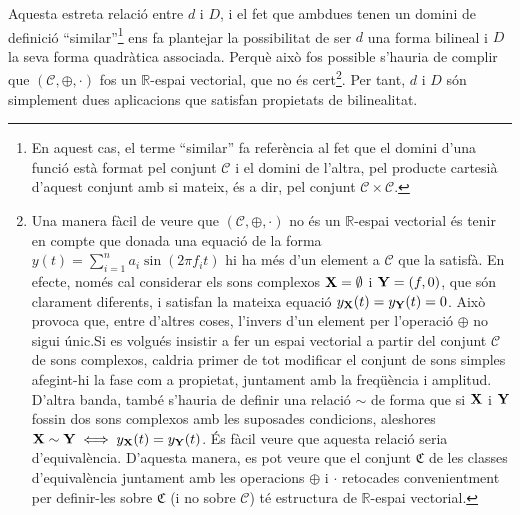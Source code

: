 \documentclass{article}
\theoremstyle{math}
\theoremstyle{TheoremNum}
\newcommand{\0}{\ensuremath{\vb{0}}}
\newcommand{\X}{\ensuremath{\vb{X}}}
\newcommand{\Y}{\ensuremath{\vb{Y}}}
\newcommand{\RR}{\ensuremath{\mathbb{R}}} %
\begin{document}
Aquesta estreta relació entre $d$ i $D$, i el fet que ambdues tenen un domini de definició ``similar''\footnote{En aquest cas, el terme ``similar'' fa referència al fet que el domini d'una funció està format pel conjunt $\mathcal{C}$ i el domini de l'altra, pel producte cartesià d'aquest conjunt amb si mateix, és a dir, pel conjunt $\mathcal{C}\times\mathcal{C}$.} ens fa plantejar la possibilitat de ser $d$ una forma bilineal i $D$ la seva forma quadràtica associada. Perquè això fos possible s'hauria de complir que $(\mathcal{C},\oplus,\cdot)$ fos un $\RR$-espai vectorial, que no és cert\footnote{Una manera fàcil de veure que $(\mathcal{C},\oplus,\cdot)$ no és un $\RR$-espai vectorial és tenir en compte que donada una equació de la forma $y(t)=\sum_{i=1}^na_i\sin(2\pi f_it)$ hi ha més d'un element a $\mathcal{C}$ que la satisfà. En efecte, només cal considerar els sons complexos $\X=\emptyset$ i $\Y=(f,0)$, que són clarament diferents, i satisfan la mateixa equació $y_{\X}(t)=y_{\Y}(t)=0$. Això provoca que, entre d'altres coses, l'invers d'un element per l'operació $\oplus$ no sigui únic.\newline Si es volgués insistir a fer un espai vectorial a partir del conjunt $\mathcal{C}$ de sons complexos, caldria primer de tot modificar el conjunt de sons simples afegint-hi la fase com a propietat, juntament amb la freqüència i amplitud. D'altra banda, també s'hauria de definir una relació $\sim$ de forma que si $\X$ i $\Y$ fossin dos sons complexos amb les suposades condicions, aleshores $\X\sim \Y\iff y_{\X}(t)=y_{\Y}(t)$. És fàcil veure que aquesta relació seria d'equivalència. D'aquesta manera, es pot veure que el conjunt $\mathfrak{C}$ de les classes d'equivalència juntament amb les operacions $\oplus$ i $\cdot$ retocades convenientment per definir-les sobre $\mathfrak{C}$ (i no sobre $\mathcal{C}$) té estructura de $\RR$-espai vectorial.}. Per tant, $d$ i $D$ són simplement dues aplicacions que satisfan propietats de bilinealitat.
\end{document}
